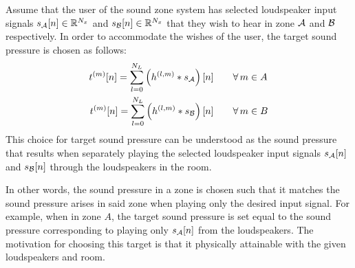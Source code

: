 Assume that the user of the sound zone system has selected loudspeaker input signals $s_{\mathcal{A}}[n]\in\mathbb{R}^{N_x}$ and
$s_{\mathcal{B}}[n]\in\mathbb{R}^{N_x}$ that they wish to hear in zone $\mathcal{A}$ and $\mathcal{B}$ respectively.
In order to accommodate the wishes of the user, the target sound pressure is chosen as follows: 
\begin{align}
    t^{(m)}[n] = \sum_{l=0}^{N_L} \left(h^{(l,m)} \ast s_{\mathcal{A}}\right)[n]\qquad &\forall\,m\in A\\
    t^{(m)}[n] = \sum_{l=0}^{N_L} \left(h^{(l,m)} \ast s_{\mathcal{B}}\right)[n]\qquad &\forall\,m\in B
\end{align}
This choice for target sound pressure can be understood as the sound pressure that results when separately playing the
selected loudspeaker input signals $s_{\mathcal{A}}[n]$ and $s_{\mathcal{B}}[n]$ through the loudspeakers in the room.

In other words, the sound pressure in a zone is chosen such that it matches the sound pressure arises in said zone when playing only the desired input signal. 
For example, when in zone $A$, the target sound pressure is set equal to the sound pressure corresponding to playing only $s_{\mathcal{A}}[n]$ from the loudspeakers.
The motivation for choosing this target is that it physically attainable with the given loudspeakers and room.

